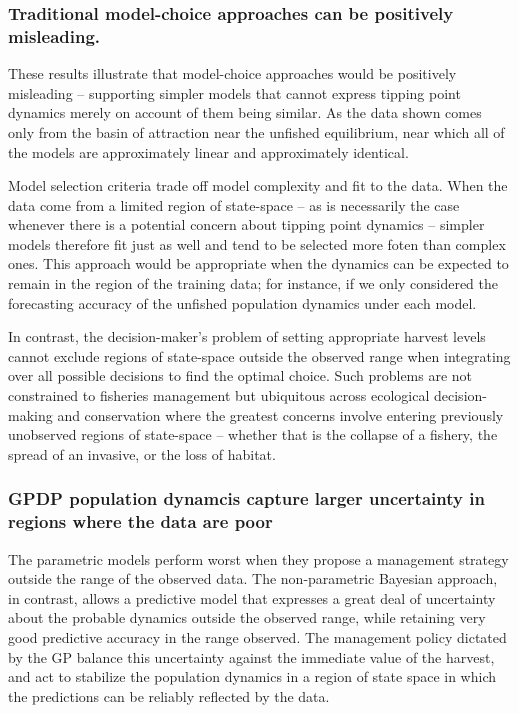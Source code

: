 \documentclass[]{components/elsarticle}
\begin{document}
\subsubsection{Traditional model-choice approaches can be positively
misleading.}\label{traditional-model-choice-approaches-can-be-positively-misleading.}

These results illustrate that model-choice approaches would be
positively misleading -- supporting simpler models that cannot express
tipping point dynamics merely on account of them being similar. As the
data shown comes only from the basin of attraction near the unfished
equilibrium, near which all of the models are approximately linear and
approximately identical.

Model selection criteria trade off model complexity and fit to the data.
When the data come from a limited region of state-space -- as is
necessarily the case whenever there is a potential concern about tipping
point dynamics -- simpler models therefore fit just as well and tend to
be selected more foten than complex ones. This approach would be
appropriate when the dynamics can be expected to remain in the region of
the training data; for instance, if we only considered the forecasting
accuracy of the unfished population dynamics under each model.

In contrast, the decision-maker's problem of setting appropriate harvest
levels cannot exclude regions of state-space outside the observed range
when integrating over all possible decisions to find the optimal choice.
Such problems are not constrained to fisheries management but ubiquitous
across ecological decision-making and conservation where the greatest
concerns involve entering previously unobserved regions of state-space
-- whether that is the collapse of a fishery, the spread of an invasive,
or the loss of habitat.

\subsubsection{GPDP population dynamcis capture larger uncertainty in
regions where the data are
poor}\label{gpdp-population-dynamcis-capture-larger-uncertainty-in-regions-where-the-data-are-poor}

The parametric models perform worst when they propose a management
strategy outside the range of the observed data. The non-parametric
Bayesian approach, in contrast, allows a predictive model that expresses
a great deal of uncertainty about the probable dynamics outside the
observed range, while retaining very good predictive accuracy in the
range observed. The management policy dictated by the GP balance this
uncertainty against the immediate value of the harvest, and act to
stabilize the population dynamics in a region of state space in which
the predictions can be reliably reflected by the data.
\end{document}
